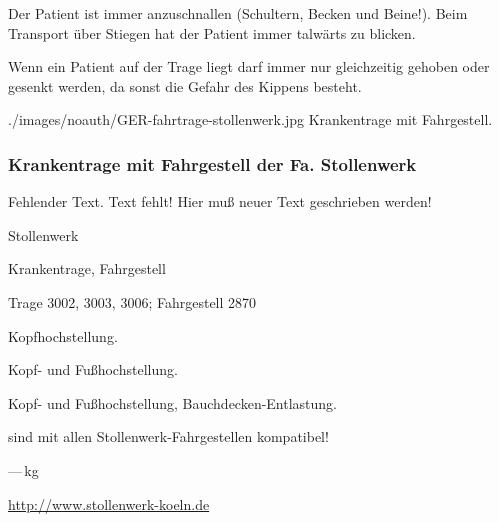 {
Der Patient ist immer anzuschnallen (Schultern, Becken und Beine!). Beim
Transport über Stiegen hat der Patient immer talwärts zu blicken. 

Wenn ein Patient auf der Trage liegt darf immer nur  gleichzeitig
gehoben oder gesenkt werden, da sonst die Gefahr des Kippens besteht. 

}{

}
{./images/noauth/GER-fahrtrage-stollenwerk.jpg}
{Krankentrage mit Fahrgestell.}
{}

\subsubsection{Krankentrage mit Fahrgestell der Fa. Stollenwerk}
\begin{anfxerror}[author=GABS]{Fehlender Text.}
  Text fehlt! Hier muß neuer Text geschrieben werden!
\end{anfxerror}

\begin{compactdesc}
    \item[Hersteller:] Stollenwerk
    \item[Produktfamilie:] Krankentrage, Fahrgestell
    \item[Modell/Typ:] Trage 3002, 3003, 3006; Fahrgestell 2870
    \item[Modellbesonderheiten:] \begin{inparadesc}
    \item[Trage 3002:] Kopfhochstellung. 
    \item[Trage 3003:] Kopf- und Fußhochstellung. 
    \item[Trage 3006:] Kopf- und Fußhochstellung, Bauchdecken-Entlastung. 
    \item[Alle Tragen:] sind mit allen Stollenwerk-Fahrgestellen kompatibel!
\end{inparadesc}   
    \item[Max. Belastbarkeit:] ---\,kg
    \item[Homepage:] \url{http://www.stollenwerk-koeln.de}
    \item[Hygienische Wiederaufbereitung:]
\end{compactdesc}

